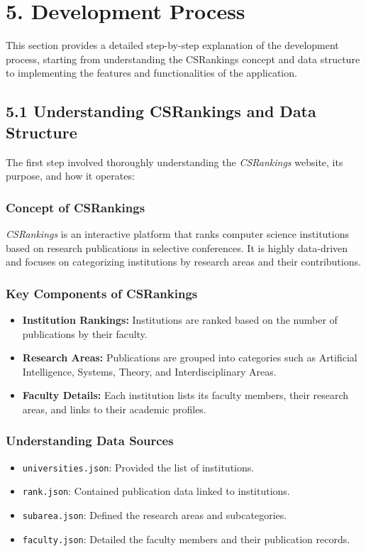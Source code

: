 \documentclass[12pt]{article}
\begin{document}
\bigskip
\section*{5. Development Process}
This section provides a detailed step-by-step explanation of the development process, starting from understanding the CSRankings concept and data structure to implementing the features and functionalities of the application.

\subsection*{5.1 Understanding CSRankings and Data Structure}

The first step involved thoroughly understanding the \textit{CSRankings} website, its purpose, and how it operates:

\subsubsection*{Concept of CSRankings}
\textit{CSRankings} is an interactive platform that ranks computer science institutions based on research publications in selective conferences. It is highly data-driven and focuses on categorizing institutions by research areas and their contributions.

\subsubsection*{Key Components of CSRankings}
\begin{itemize}
    \item \textbf{Institution Rankings:} Institutions are ranked based on the number of publications by their faculty.
    \item \textbf{Research Areas:} Publications are grouped into categories such as Artificial Intelligence, Systems, Theory, and Interdisciplinary Areas.
    \item \textbf{Faculty Details:} Each institution lists its faculty members, their research areas, and links to their academic profiles.
\end{itemize}

\subsubsection*{Understanding Data Sources}
\begin{itemize}
    \item \texttt{universities.json}: Provided the list of institutions.
    \item \texttt{rank.json}: Contained publication data linked to institutions.
    \item \texttt{subarea.json}: Defined the research areas and subcategories.
    \item \texttt{faculty.json}: Detailed the faculty members and their publication records.
\end{itemize}
\end{document}
